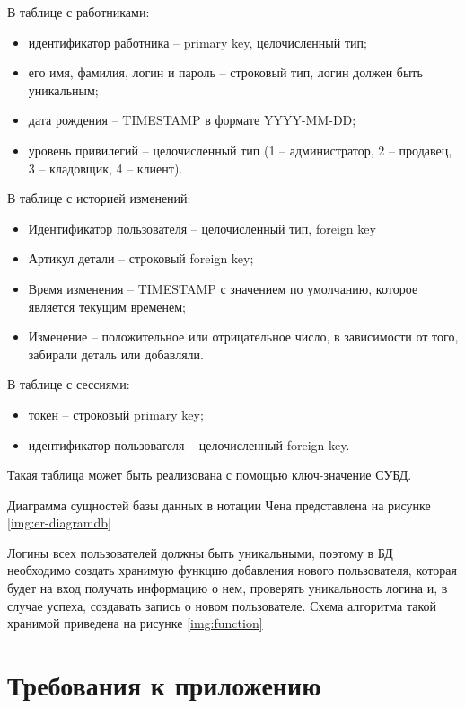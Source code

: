 В таблице с работниками:
\begin{itemize}
	\item идентификатор работника -- primary key, целочисленный тип;
	\item его имя, фамилия, логин и пароль -- строковый тип, логин должен быть уникальным;
	\item дата рождения -- TIMESTAMP в формате YYYY-MM-DD;
	\item уровень привилегий -- целочисленный тип (1 -- администратор, 2 -- продавец, 3 -- кладовщик, 4 -- клиент). 
\end{itemize}

В таблице с историей изменений:
\begin{itemize}
	\item Идентификатор пользователя -- целочисленный тип, foreign key
	\item Артикул детали -- строковый foreign key;
	\item Время изменения -- TIMESTAMP с значением по умолчанию, которое является текущим временем;
	\item Изменение -- положительное или отрицательное число, в зависимости от того, забирали деталь или добавляли.
\end{itemize}

В таблице с сессиями:
\begin{itemize}
	\item токен -- строковый primary key;
	\item идентификатор пользователя -- целочисленный foreign key.
\end{itemize}

Такая таблица может быть реализована с помощью ключ-значение СУБД.

Диаграмма сущностей базы данных в нотации Чена представлена на рисунке \ref{img:er-diagramdb}


Логины всех пользователей должны быть уникальными, поэтому в БД необходимо создать хранимую функцию добавления нового пользователя, которая будет на вход получать информацию о нем, проверять уникальность логина и, в случае успеха, создавать запись о новом пользователе. Схема алгоритма такой хранимой приведена на рисунке \ref{img:function}


\section{Требования к приложению}

